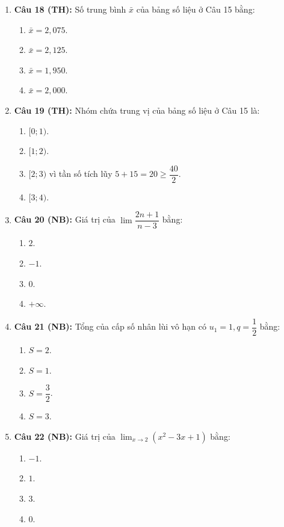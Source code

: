 \documentclass[12pt, a4paper]{article}
\begin{document}
\begin{enumerate}[leftmargin=0.8cm]
    \item \textbf{Câu 18 (TH):} Số trung bình $\bar{x}$ của bảng số liệu ở Câu 15 bằng:
    \begin{enumerate}[label=\Alph*., leftmargin=0.8cm]
        \item $\bar{x} = 2{,}075$.
        \item $\bar{x} = 2{,}125$.
        \item $\bar{x} = 1{,}950$.
        \item $\bar{x} = 2{,}000$.
    \end{enumerate}

    \item \textbf{Câu 19 (TH):} Nhóm chứa trung vị của bảng số liệu ở Câu 15 là:
    \begin{enumerate}[label=\Alph*., leftmargin=0.8cm]
        \item $[0; 1)$.
        \item $[1; 2)$.
        \item $[2; 3)$ vì tần số tích lũy $5 + 15 = 20 \ge \dfrac{40}{2}$.
        \item $[3; 4)$.
    \end{enumerate}

    \item \textbf{Câu 20 (NB):} Giá trị của $\lim \dfrac{2n + 1}{n - 3}$ bằng:
    \begin{enumerate}[label=\Alph*., leftmargin=0.8cm]
        \item $2$.
        \item $-1$.
        \item $0$.
        \item $+\infty$.
    \end{enumerate}

    \item \textbf{Câu 21 (NB):} Tổng của cấp số nhân lùi vô hạn có $u_1 = 1, q = \dfrac{1}{2}$ bằng:
    \begin{enumerate}[label=\Alph*., leftmargin=0.8cm]
        \item $S = 2$.
        \item $S = 1$.
        \item $S = \dfrac{3}{2}$.
        \item $S = 3$.
    \end{enumerate}

    \item \textbf{Câu 22 (NB):} Giá trị của $\lim_{x \to 2} (x^2 - 3x + 1)$ bằng:
    \begin{enumerate}[label=\Alph*., leftmargin=0.8cm]
        \item $-1$.
        \item $1$.
        \item $3$.
        \item $0$.
    \end{enumerate}


\end{enumerate}
\end{document}
